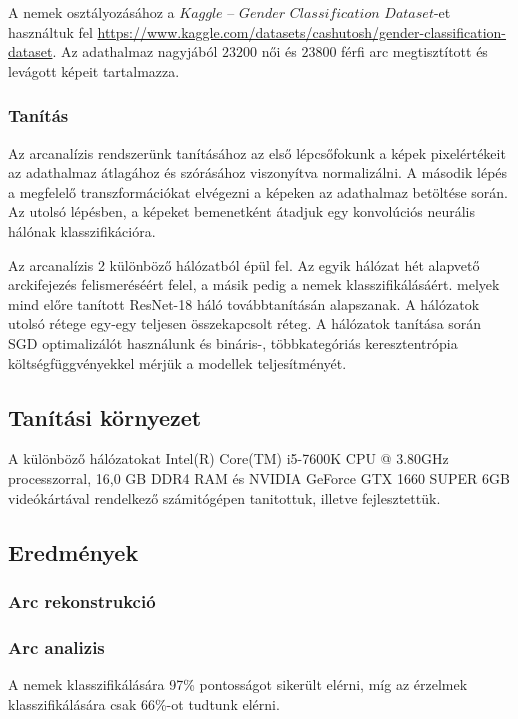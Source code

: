 \documentclass[12pt,a4]{article}
\begin{document}
    A nemek osztályozásához a $Kaggle$ – $Gender$ $Classification$ $Dataset$-et használtuk fel \url{https://www.kaggle.com/datasets/cashutosh/gender-classification-dataset}. Az adathalmaz nagyjából $23 200$ női és $23 800$ férfi arc megtisztított és levágott képeit tartalmazza.

    \subsubsection{Tanítás}

    Az arcanalízis rendszerünk tanításához az első lépcsőfokunk a képek pixelértékeit az adathalmaz átlagához és szórásához viszonyítva normalizálni. A második lépés a megfelelő transzformációkat elvégezni a képeken az adathalmaz betöltése során. Az utolsó lépésben, a képeket bemenetként átadjuk egy konvolúciós neurális hálónak klasszifikációra.

    Az arcanalízis 2 különböző hálózatból épül fel. Az egyik hálózat hét alapvető arckifejezés felismeréséért felel, a másik pedig a nemek klasszifikálásáért.
    melyek mind előre tanított ResNet-18 háló továbbtanításán alapszanak.
    A hálózatok utolsó rétege egy-egy teljesen összekapcsolt réteg.
    A hálózatok tanítása során SGD optimalizálót használunk és bináris-, többkategóriás keresztentrópia költségfüggvényekkel mérjük a modellek teljesítményét.
    
	\subsection{Tanítási környezet}

    A különböző hálózatokat Intel(R) Core(TM) i5-7600K CPU @ 3.80GHz processzorral, 16,0 GB DDR4 RAM és NVIDIA GeForce GTX 1660 SUPER 6GB videókártával rendelkező számitógépen tanitottuk, illetve fejlesztettük.

    \subsection{Eredmények}
    \subsubsection{Arc rekonstrukció}
    \subsubsection{Arc analizis}
    A nemek klasszifikálására 97\% pontosságot sikerült elérni, míg az érzelmek klasszifikálására csak 66\%-ot tudtunk elérni.
\end{document}
